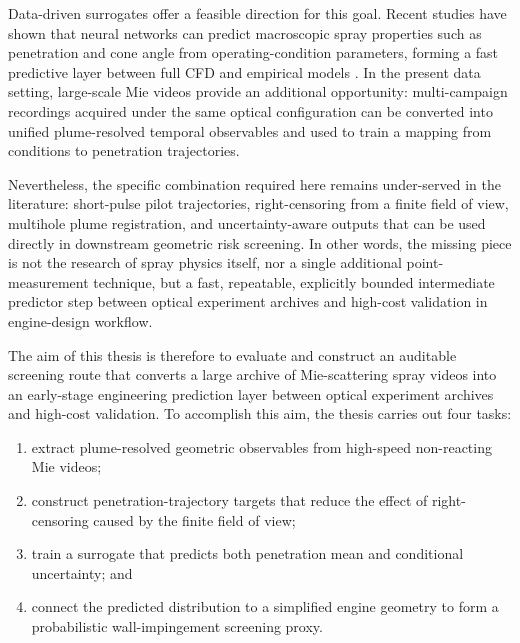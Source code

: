 \documentclass[english, 12pt, a4paper, elec, utf8, a-2b, online]{aaltothesis}
\begin{document}
Data-driven surrogates offer a feasible direction for this goal. 
Recent studies have shown that neural networks can predict macroscopic spray properties such as penetration and cone angle 
from operating-condition parameters, forming a fast predictive layer between full CFD and empirical models 
\cite{VazKarathanasis2026,liu2020sprayreview}. 
In the present data setting, large-scale Mie videos provide an additional opportunity: 
multi-campaign recordings acquired under the same optical configuration can be converted into unified plume-resolved temporal observables 
and used to train a mapping from conditions to penetration trajectories.

Nevertheless, the specific combination required here remains under-served in the literature: 
short-pulse pilot trajectories, right-censoring from a finite field of view, multihole plume registration, and uncertainty-aware outputs 
that can be used directly in downstream geometric risk screening. 
In other words, the missing piece is not the research of spray physics itself, 
nor a single additional point-measurement technique, but a fast, repeatable, explicitly bounded intermediate predictor step
between optical experiment archives and high-cost validation in engine-design workflow.

The aim of this thesis is therefore to evaluate and construct an auditable screening route 
that converts a large archive of Mie-scattering spray videos into an early-stage engineering prediction layer 
between optical experiment archives and high-cost validation.
To accomplish this aim, the thesis carries out four tasks:
\begin{enumerate}
  \item extract plume-resolved geometric observables from high-speed non-reacting Mie videos;
  \item construct penetration-trajectory targets that reduce the effect of right-censoring caused by the finite field of view;
  \item train a surrogate that predicts both penetration mean and conditional uncertainty; and
  \item connect the predicted distribution to a simplified engine geometry to form a probabilistic wall-impingement screening proxy.
\end{enumerate}
\end{document}
